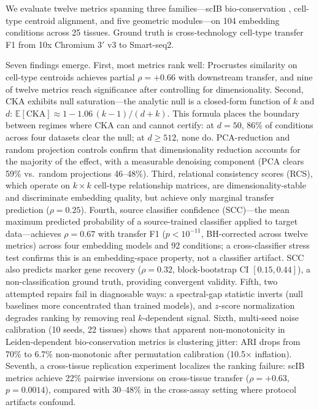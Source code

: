 \documentclass[11pt]{article}
\begin{document}
We evaluate twelve metrics spanning three families---scIB
bio-conservation \citep{luecken2022scib}, cell-type centroid alignment,
and five geometric modules---on 104 embedding conditions across 25
tissues. Ground truth is cross-technology cell-type transfer F1 from
10x Chromium 3$'$ v3 to Smart-seq2.

Seven findings emerge. First, most metrics rank well: Procrustes
similarity on cell-type centroids achieves partial $\rho = +0.66$ with
downstream transfer, and nine of twelve metrics reach significance after
controlling for dimensionality. Second, CKA exhibits null saturation---the
analytic null is a closed-form function of $k$ and $d$:
$\mathbb{E}[\mathrm{CKA}] \approx 1 - 1.06\,(k{-}1)/(d{+}k)$. This
formula places the boundary between regimes where CKA can and cannot
certify: at $d = 50$, 86\% of conditions across four datasets clear the
null; at $d \geq 512$, none do. PCA-reduction and random projection
controls confirm that dimensionality reduction accounts for the majority
of the effect, with a measurable denoising component (PCA clears 59\%
vs.\ random projections 46--48\%). Third, relational consistency scores
(RCS), which operate on $k \times k$ cell-type relationship matrices,
are dimensionality-stable and discriminate embedding quality, but
achieve only marginal transfer prediction ($\rho = 0.25$). Fourth,
source classifier confidence (SCC)---the mean maximum predicted
probability of a source-trained classifier applied to target
data---achieves $\rho = 0.67$ with transfer F1 ($p < 10^{-11}$,
BH-corrected across twelve metrics) across four embedding models and
92 conditions; a cross-classifier stress test confirms this is an
embedding-space property, not a classifier artifact. SCC also predicts
marker gene recovery ($\rho = 0.32$, block-bootstrap CI
$[0.15, 0.44]$), a non-classification ground truth, providing
convergent validity. Fifth, two attempted
repairs fail in diagnosable ways: a spectral-gap statistic inverts
(null baselines more concentrated than trained models),
and $z$-score normalization degrades ranking by removing real
$k$-dependent signal. Sixth, multi-seed noise calibration (10 seeds, 22
tissues) shows that apparent non-monotonicity in Leiden-dependent
bio-conservation metrics is clustering jitter: ARI drops from 70\% to
6.7\% non-monotonic after permutation calibration (10.5$\times$
inflation). Seventh, a cross-tissue replication experiment localizes the
ranking failure: scIB metrics achieve 22\% pairwise inversions on
cross-tissue transfer ($\rho = +0.63$, $p = 0.0014$), compared with
30--48\% in the cross-assay setting where protocol artifacts confound.
\end{document}
